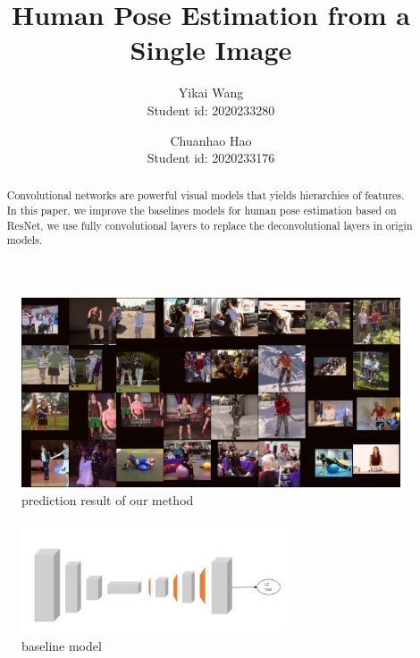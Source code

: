 \documentclass[final]{cvpr}
\begin{document}
\title{Human Pose Estimation from a Single Image}

\author{Yikai Wang\\
Student id: 2020233280\\
{}
\and
Chuanhao Hao\\
Student id: 2020233176\\
{}
}

\maketitle


\begin{abstract}
Convolutional networks are powerful visual models that yields hierarchies of features. In this paper, we improve the baselines models for human pose estimation based on ResNet\cite{he2016deep}, we use fully convolutional layers to replace the deconvolutional layers in origin models.
\end{abstract}


\begin{figure}[h]
\centering
\includegraphics[width=\textwidth]{pred.jpg}
\caption{prediction result of our method}
\end{figure}

\begin{figure}[h]
\centering
\includegraphics[width=0.7\textwidth]{Resnet.jpg}
\caption{baseline model}
\end{figure}
\end{document}
